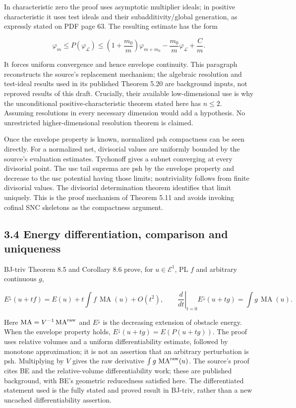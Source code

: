 \documentclass[
  11pt,
]{article}
\begin{document}
In characteristic zero the proof uses asymptotic multiplier ideals; in
positive characteristic it uses test ideals and their
subadditivity/global generation, as expressly stated on PDF page 63. The
resulting estimate has the form

\[\varphi_m\leq P(\varphi_{\mathcal L})\leq\left(1+\frac{m_0}{m}\right)\varphi_{m+m_0}-\frac{m_0}{m}\varphi_{\mathcal L}+\frac C m.\]

It forces uniform convergence and hence envelope continuity. This
paragraph reconstructs the source's replacement mechanism; the algebraic
resolution and test-ideal results used in its published Theorem 5.20 are
background inputs, not reproved results of this draft. Crucially, their
available low-dimensional use is why the unconditional
positive-characteristic theorem stated here has \(n\leq2\). Assuming
resolutions in every necessary dimension would add a hypothesis. No
unrestricted higher-dimensional resolution theorem is claimed.

Once the envelope property is known, normalized psh compactness can be
seen directly. For a normalized net, divisorial values are uniformly
bounded by the source's evaluation estimates. Tychonoff gives a subnet
converging at every divisorial point. The usc tail suprema are psh by
the envelope property and decrease to the usc potential having those
limits; nontriviality follows from finite divisorial values. The
divisorial determination theorem identifies that limit uniquely. This is
the proof mechanism of Theorem 5.11 and avoids invoking cofinal SNC
skeletons as the compactness argument.

\subsection{3.4 Energy differentiation, comparison and
uniqueness}\label{energy-differentiation-comparison-and-uniqueness}

BJ-triv Theorem 8.5 and Corollary 8.6 prove, for \(u\in\mathcal E^1\),
PL \(f\) and arbitrary continuous \(g\),

\[E^\downarrow(u+tf)=E(u)+t\int f\,\operatorname{MA}(u)+O(t^2),\qquad \left.\frac d{dt}\right|_{t=0}E^\downarrow(u+tg)=\int g\,\operatorname{MA}(u).\]

Here \(\operatorname{MA}=V^{-1}\operatorname{MA}^{\rm raw}\) and
\(E^\downarrow\) is the decreasing extension of obstacle energy. When
the envelope property holds, \(E^\downarrow(u+tg)=E(P(u+tg))\). The
proof uses relative volumes and a uniform differentiability estimate,
followed by monotone approximation; it is not an assertion that an
arbitrary perturbation is psh. Multiplying by \(V\) gives the raw
derivative \(\int g\,\operatorname{MA}^{\rm raw}(u)\). The source's
proof cites BE and the relative-volume differentiability work; these are
published background, with BE's geometric reducedness satisfied here.
The differentiated statement used is the fully stated and proved result
in BJ-triv, rather than a new uncached differentiability assertion.
\end{document}
